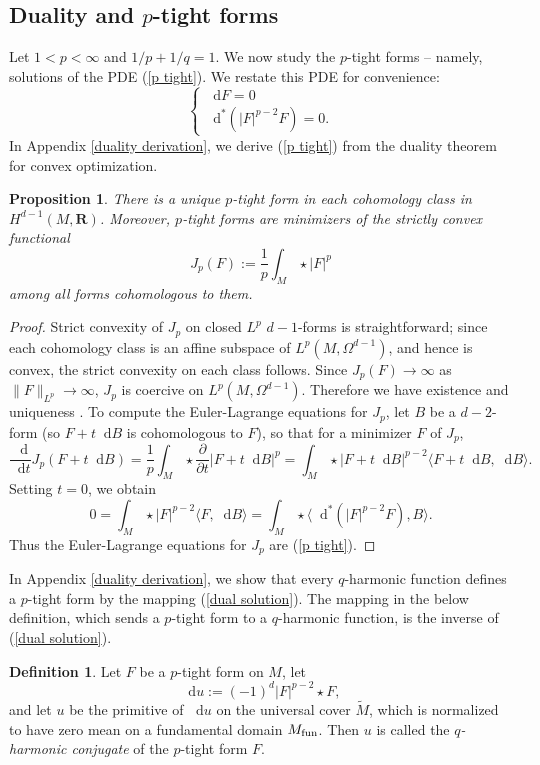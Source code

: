 \documentclass[reqno,11pt]{amsart}
\newcommand{\RR}{\mathbf{R}}
\newcommand*\dif{\mathop{}\!\mathrm{d}}
\newcommand{\dfn}[1]{\emph{#1}\index{#1}}
\newtheorem{proposition}[theorem]{Proposition}
\theoremstyle{definition}
\newtheorem{definition}[theorem]{Definition}
\numberwithin{equation}{section}
\begin{document}
\subsection{Duality and \texorpdfstring{$p$-tight forms}{p-tight forms}}
Let $1 < p < \infty$ and $1/p + 1/q = 1$.
We now study the $p$-tight forms -- namely, solutions of the PDE (\ref{p tight}).
We restate this PDE for convenience:
$$\begin{cases}\dif F = 0 \\
	\dif^* (|F|^{p - 2} F) = 0.
\end{cases}$$
In Appendix \ref{duality derivation}, we derive (\ref{p tight}) from the duality theorem for convex optimization.

\begin{proposition}
There is a unique $p$-tight form in each cohomology class in $H^{d - 1}(M, \RR)$.
Moreover, $p$-tight forms are minimizers of the strictly convex functional
$$J_p(F) := \frac{1}{p} \int_M \star |F|^p$$
among all forms cohomologous to them.
\end{proposition}
\begin{proof}
Strict convexity of $J_p$ on closed $L^p$ $d - 1$-forms is straightforward; since each cohomology class is an affine subspace of $L^p(M, \Omega^{d - 1})$, and hence is convex, the strict convexity on each class follows.
Since $J_p(F) \to \infty$ as $\|F\|_{L^p} \to \infty$, $J_p$ is coercive on $L^p(M, \Omega^{d - 1})$.
Therefore we have existence and uniqueness \cite[Chapter II]{Ekeland99}.
To compute the Euler-Lagrange equations for $J_p$, let $B$ be a $d-2$-form (so $F + t \dif B$ is cohomologous to $F$), so that for a minimizer $F$ of $J_p$,
$$\frac{\dif}{\dif t} J_p(F + t \dif B) = \frac{1}{p} \int_M \star \frac{\partial}{\partial t} |F + t \dif B|^p = \int_M \star |F + t \dif B|^{p - 2} \langle F + t \dif B, \dif B\rangle.$$
Setting $t = 0$, we obtain 
$$0 = \int_M \star |F|^{p - 2} \langle F, \dif B\rangle = \int_M \star \langle \dif^*(|F|^{p - 2} F), B\rangle.$$
Thus the Euler-Lagrange equations for $J_p$ are (\ref{p tight}).
\end{proof}

In Appendix \ref{duality derivation}, we show that every $q$-harmonic function defines a $p$-tight form by the mapping (\ref{dual solution}).
The mapping in the below definition, which sends a $p$-tight form to a $q$-harmonic function, is the inverse of (\ref{dual solution}).

\begin{definition}
Let $F$ be a $p$-tight form on $M$, let
\begin{equation}
\dif u := (-1)^d |F|^{p - 2} \star F, \label{inverse extremality}
\end{equation}
and let $u$ be the primitive of $\dif u$ on the universal cover $\tilde M$, which is normalized to have zero mean on a fundamental domain $M_{\rm fun}$.
Then $u$ is called the \dfn{$q$-harmonic conjugate} of the $p$-tight form $F$.
\end{definition}
\end{document}
